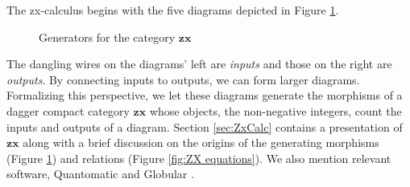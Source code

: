 \documentclass[./1--Catfying_zxCalc--Master.tex]{subfiles} %
\begin{document}
The zx-calculus begins with 
the five diagrams depicted 
in Figure \ref{fig:ZX generators}.
\begin{figure}
	\caption{Generators for the category $\mathbf{zx}$}
	\label{fig:ZX generators}
\end{figure}
The dangling wires 
on the diagrams' left 
are \emph{inputs} and 
those on the right are \emph{outputs}. 
By connecting inputs to outputs, 
we can form larger diagrams.  
Formalizing this perspective, 
we let these diagrams 
generate the morphisms of 
a dagger compact category 
$\mathbf{zx}$ whose 
objects, the non-negative integers, 
count the inputs and outputs
of a diagram.  
Section 
	\ref{sec:ZxCalc} 
contains a presentation of $\mathbf{zx}$ 
along with a brief discussion on 
the origins of the generating morphisms 
(Figure \ref{fig:ZX generators}) 
and relations (Figure \ref{fig:ZX equations}). 
We also mention relevant software, 
Quantomatic 
	\cite{AbramCoecke_CatSemanticQuantum,
		KissingerZamd_Quantomatic} 
and Globular 
	\cite{BarKissingerVicary_Globular}.  
\end{document}
